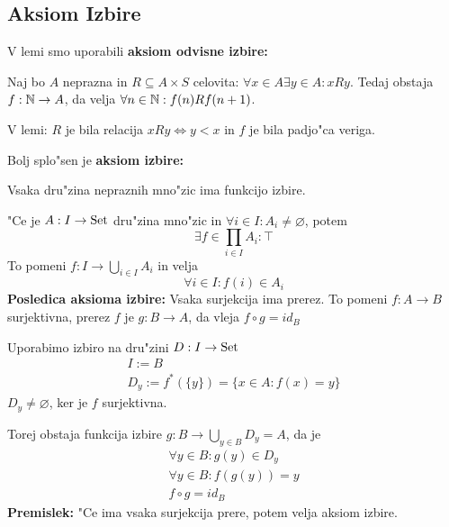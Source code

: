 \subsection{Aksiom Izbire}
V lemi smo uporabili \textbf{aksiom odvisne izbire:}

Naj bo $A$ neprazna in $R \subseteq A \times S$ celovita: $\forall x \in A \exists y \in A: x R y$. Tedaj obstaja $f: \mathbb{N} \to A$, da velja $\forall n \in \mathbb{N}: f(n) R f(n+1)$.

V lemi: $R$ je bila relacija $x R y \iff y < x$ in $f$ je bila padjo"ca veriga.

Bolj splo"sen je \textbf{aksiom izbire:}

Vsaka dru"zina nepraznih mno"zic ima funkcijo izbire.

"Ce je $A : I \to \text{Set}$ dru"zina mno"zic in $\forall i \in I: A_i \neq \varnothing$, potem 
\begin{equation*}
\exists f \in \prod_{i \in I} A_i: \top
\end{equation*}
To pomeni $f: I \to \bigcup_{i \in I} A_i$ in velja
\begin{equation*}
\forall i \in I: f(i) \in A_i
\end{equation*}
\textbf{Posledica aksioma izbire:} Vsaka surjekcija ima prerez. To pomeni $f: A \to B$ surjektivna, prerez $f$ je $g: B \to A$, da vleja $f \circ g = id_B$

Uporabimo izbiro na dru"zini $D: I \to \text{Set}$
\begin{gather*}
I := B \\
D_y := f^*(\{y\}) = \{x \in A: f(x) = y\}
\end{gather*}
$D_y \neq \varnothing$, ker je $f$ surjektivna.

Torej obstaja funkcija izbire $g: B \to \bigcup_{y \in B} D_y = A$, da je
\begin{gather*}
\forall y \in B: g (y) \in D_y \\
\forall y \in B: f(g(y)) = y \\
f \circ g = id_B
\end{gather*}
\textbf{Premislek:} "Ce ima vsaka surjekcija prere, potem velja aksiom izbire.